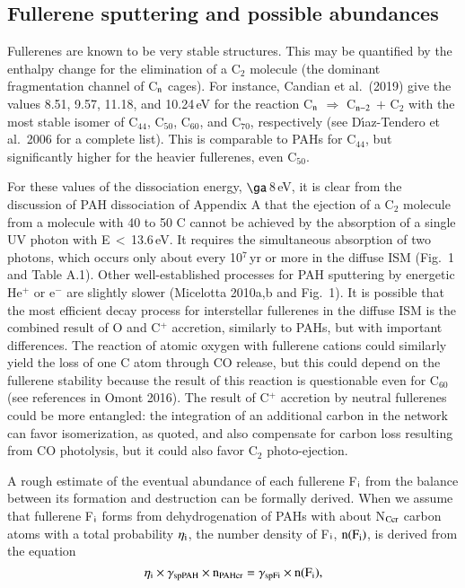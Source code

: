 \documentclass{aa}
\begin{document}
\subsection{Fullerene sputtering and possible abundances}

Fullerenes are known to be very stable structures. This may be quantified 
by the enthalpy
change for the elimination of a C$_2$ molecule (the dominant fragmentation channel of C$_{\rm n}$ cages). For instance, Candian et al.\ (2019) give the values 8.51, 9.57, 11.18, and 10.24\,eV for the reaction C$_{\rm n}$ 
$\Rightarrow$ C$_{\rm n-2}$  $+$ C$_2$ with the most stable isomer of C$_{44}$, C$_{50}$, C$_{60}$, and C$_{70}$, respectively (see D{\'\i}az-Tendero et al.\ 2006 for a complete list). This is comparable to PAHs for C$_{44}$, but significantly higher for the heavier fullerenes, even C$_{50}$. 

For these values of the dissociation energy, $\ga$\,8\,eV, it is clear from the discussion of PAH dissociation of Appendix A  that the ejection of a C$_2$ molecule from a molecule with 40 to 50 C
cannot be achieved by the absorption of a single UV photon with E\,$<$\,13.6\,eV. It  requires the simultaneous absorption of two photons, which occurs only about every 10$^7$\,yr or more in the diffuse ISM (Fig.\ 1 and 
Table A.1). Other well-established processes for PAH sputtering by energetic  He$^+$ or e$^-$ are slightly slower (Micelotta 2010a,b and Fig.\ 1). 
It is possible  that the most efficient decay process for interstellar fullerenes in the diffuse ISM is the combined result of O and C$^+$ accretion, similarly to PAHs, but with important differences. The reaction of atomic oxygen with  fullerene cations could similarly yield the loss of one 
C atom through CO release, but this could depend on the fullerene stability because the result of this reaction is questionable even for C$_{60}$ (see references in Omont 2016). The result of C$^+$ accretion by neutral fullerenes could be more entangled: 
the integration of an additional  carbon in the network can favor isomerization, as quoted, and also compensate for carbon loss resulting from CO photolysis, but it could also favor C$_2$ photo-ejection.

A rough estimate of the eventual abundance of  each fullerene F$_{\rm i}$ from the balance between its formation and destruction can be formally derived. When we assume that fullerene  F$_{\rm i}$ forms from dehydrogenation of PAHs with about N$_{\rm Ccr}$ carbon atoms with a total probability $\eta_{\rm i}$,
the number density of F$_{\rm i}$, ${\rm n(F_i)}$, is derived from the equation 
\begin{equation}
{\rm  \eta_i \times   \gamma_{spPAH} \times n_{PAHcr} =  \gamma_{spFi} \times n(F_i)}
,\end{equation} 
\end{document}
